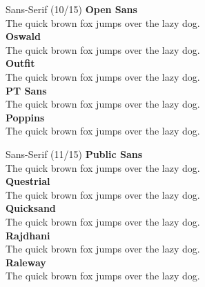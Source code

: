 \documentclass[10pt]{beamer}
\begin{document}
\begin{frame}{Sans-Serif (10/15)}
\vspace{-0.2cm}
  {\OpenSansLocal\Large\bfseries Open Sans\\}
  {\OpenSansLocal The quick brown fox jumps over the lazy dog.\\[0.3cm]}
  {\OswaldLocal\Large\bfseries Oswald\\}
  {\OswaldLocal The quick brown fox jumps over the lazy dog.\\[0.3cm]}
  {\OutfitLocal\Large\bfseries Outfit\\}
  {\OutfitLocal The quick brown fox jumps over the lazy dog.\\[0.3cm]}
  {\PTSansLocal\Large\bfseries PT Sans\\}
  {\PTSansLocal The quick brown fox jumps over the lazy dog.\\[0.3cm]}
  {\PoppinsLocal\Large\bfseries Poppins\\}
  {\PoppinsLocal The quick brown fox jumps over the lazy dog.\\[0.3cm]}
\end{frame}

\begin{frame}{Sans-Serif (11/15)}
\vspace{-0.2cm}
  {\PublicSansLocal\Large\bfseries Public Sans\\}
  {\PublicSansLocal The quick brown fox jumps over the lazy dog.\\[0.3cm]}
  {\QuestrialLocal\Large\bfseries Questrial\\}
  {\QuestrialLocal The quick brown fox jumps over the lazy dog.\\[0.3cm]}
  {\QuicksandLocal\Large\bfseries Quicksand\\}
  {\QuicksandLocal The quick brown fox jumps over the lazy dog.\\[0.3cm]}
  {\RajdhaniLocal\Large\bfseries Rajdhani\\}
  {\RajdhaniLocal The quick brown fox jumps over the lazy dog.\\[0.3cm]}
  {\RalewayLocal\Large\bfseries Raleway\\}
  {\RalewayLocal The quick brown fox jumps over the lazy dog.\\[0.3cm]}
\end{frame}
\end{document}
